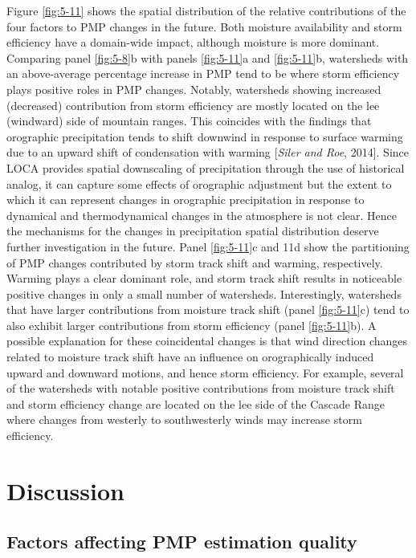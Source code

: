 Figure \ref{fig:5-11} shows the spatial distribution of the relative contributions of the four factors to PMP changes in the future. Both moisture availability and storm efficiency have a domain-wide impact, although moisture is more dominant. Comparing panel \ref{fig:5-8}b with panels \ref{fig:5-11}a and \ref{fig:5-11}b, watersheds with an above-average percentage increase in PMP tend to be where storm efficiency plays positive roles in PMP changes. Notably, watersheds showing increased (decreased) contribution from storm efficiency are mostly located on the lee (windward) side of mountain ranges. This coincides with the findings that orographic precipitation tends to shift downwind in response to surface warming due to an upward shift of condensation with warming [\textit{Siler and Roe}, 2014]. Since LOCA provides spatial downscaling of precipitation through the use of historical analog, it can capture some effects of orographic adjustment but the extent to which it can represent changes in orographic precipitation in response to dynamical and thermodynamical changes in the atmosphere is not clear. Hence the mechanisms for the changes in precipitation spatial distribution deserve further investigation in the future. Panel \ref{fig:5-11}c and 11d show the partitioning of PMP changes contributed by storm track shift and warming, respectively. Warming plays a clear dominant role, and storm track shift results in noticeable positive changes in only a small number of watersheds. Interestingly, watersheds that have larger contributions from moisture track shift (panel \ref{fig:5-11}c) tend to also exhibit larger contributions from storm efficiency (panel \ref{fig:5-11}b). A possible explanation for these coincidental changes is that wind direction changes related to moisture track shift have an influence on orographically induced upward and downward motions, and hence storm efficiency. For example, several of the watersheds with notable positive contributions from moisture track shift and storm efficiency change are located on the lee side of the Cascade Range where changes from westerly to southwesterly winds may increase storm efficiency.

\section{Discussion}

\subsection{Factors affecting PMP estimation quality}

